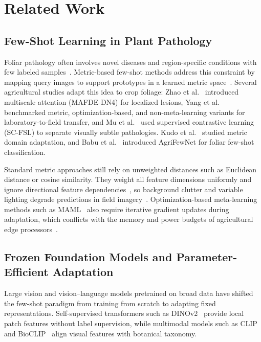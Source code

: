 \documentclass[preprint,12pt]{elsarticle}
\begin{document}
\section{Related Work}
\label{sec:related_work}

\subsection{Few-Shot Learning in Plant Pathology}
Foliar pathology often involves novel diseases and region-specific conditions with few labeled samples~\cite{shoaib2023advanced,sun2024few}. Metric-based few-shot methods address this constraint by mapping query images to support prototypes in a learned metric space~\cite{snell2017prototypical}. Several agricultural studies adapt this idea to crop foliage: Zhao et al.~\cite{zhao2024mafde} introduced multiscale attention (MAFDE-DN4) for localized lesions, Yang et al.~\cite{yang2024laboratory} benchmarked metric, optimization-based, and non-meta-learning variants for laboratory-to-field transfer, and Mu et al.~\cite{mu2024few} used supervised contrastive learning (SC-FSL) to separate visually subtle pathologies. Kudo et al.~\cite{kudo2024few} studied metric domain adaptation, and Babu et al.~\cite{babu2025agrifewnet} introduced AgriFewNet for foliar few-shot classification.

Standard metric approaches still rely on unweighted distances such as Euclidean distance or cosine similarity. They weight all feature dimensions uniformly and ignore directional feature dependencies~\cite{bateni2020improved}, so background clutter and variable lighting degrade predictions in field imagery~\cite{yang2024laboratory}. Optimization-based meta-learning methods such as MAML~\cite{finn2017maml} also require iterative gradient updates during adaptation, which conflicts with the memory and power budgets of agricultural edge processors~\cite{radocaj2025evolution}.

\subsection{Frozen Foundation Models and Parameter-Efficient Adaptation}
Large vision and vision--language models pretrained on broad data have shifted the few-shot paradigm from training from scratch to adapting fixed representations. Self-supervised transformers such as DINOv2~\cite{oquab2023dinov2} provide local patch features without label supervision, while multimodal models such as CLIP~\cite{radford2021clip} and BioCLIP~\cite{stevens2024bioclip} align visual features with botanical taxonomy.
\end{document}
